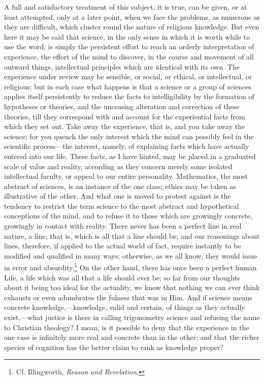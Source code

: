 \documentclass[12pt,a5paper]{article}
\begin{document}
A full and satisfactory treatment of this subject, it is
true, can be given, or at least attempted, only at a later
point, when we face the problems, as numerous as they are
difficult, which cluster round the nature of religious knowledge.
But even here it may be said that science, in the
only sense in which it is worth while to use the word, is
simply the persistent effort to reach an orderly interpretation
of experience, the effort of the mind to discover, in the
course and movement of all outward things, intellectual
principles which are identical with its own. The experience
under review may be sensible, or social, or ethical, or intellectual,
or religious; but in each case what happens is that
a science or a group of sciences applies itself persistently to
reduce the facts to intelligibility by the formation of hypotheses
or theories, and the unceasing alteration and correction
of these theories, till they correspond with and account
for the experiential facts from which they set out. Take
away the experience, that is, and you take away the science;
for you quench the only interest which the mind can possibly
feel in the scientific process---the interest, namely, of
explaining facts which have actually entered into our life.
These facts, as I have hinted, may be placed in a graduated
scale of value and reality, according as they concern merely
some isolated intellectual faculty, or appeal to our entire
personality. Mathematics, the most abstract of sciences,
is an instance of the one class; ethics may be taken as
illustrative of the other. And what one is moved to protest
against is the tendency to restrict the term science to
the most abstract and hypothetical conceptions of the
mind, and to refuse it to those which are growingly concrete,
growingly in contact with reality. There never has
been a perfect line in real nature, a line, that is, which is all
that a line should be; and our reasonings about lines, therefore,
if applied to the actual world of fact, require instantly to
be modified and qualified in many ways; otherwise, as we all
know, they would issue in error and absurdity.\footnote{
Cf. Illingworth, \textit{Reason and Revelation}.
} 
On the
other hand, there has once been a perfect human Life, a life
which was all that a life should ever be; so far from our
thoughts about it being too ideal for the actuality, we
know that nothing we can ever think exhausts or even
adumbrates the fulness that was in Him. And if science
means concrete knowledge,---knowledge, valid and certain,
of things as they actually exist,---what justice is there in
calling trigonometry science and refusing the name to
Christian theology? I mean, is it possible to deny that the
experience in the one case is infinitely more real and concrete
than in the other; and that the richer species of
cognition has the better claim to rank as knowledge
proper?
\end{document}
